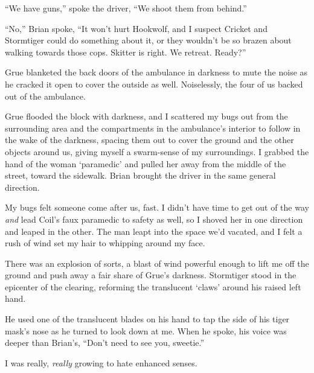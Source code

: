 ``We have guns,'' spoke the driver, ``We shoot them from behind.''



``No,'' Brian spoke, ``It won't hurt Hookwolf, and I suspect Cricket and Stormtiger could do something about it, or they wouldn't be so brazen about walking towards those cops.  Skitter is right.  We retreat.  Ready?''



Grue blanketed the back doors of the ambulance in darkness to mute the noise as he cracked it open to cover the outside as well.  Noiselessly, the four of us backed out of the ambulance.



Grue flooded the block with darkness, and I scattered my bugs out from the surrounding area and the compartments in the ambulance's interior to follow in the wake of the darkness, spacing them out to cover the ground and the other objects around us, giving myself a swarm-sense of my surroundings.  I grabbed the hand of the woman `paramedic' and pulled her away from the middle of the street, toward the sidewalk.  Brian brought the driver in the same general direction.



My bugs felt someone come after us, fast.  I didn't have time to get out of the way \emph{and} lead Coil's faux paramedic to safety as well, so I shoved her in one direction and leaped in the other.  The man leapt into the space we'd vacated, and I felt a rush of wind set my hair to whipping around my face.



There was an explosion of sorts, a blast of wind powerful enough to lift me off the ground and push away a fair share of Grue's darkness.  Stormtiger stood in the epicenter of the clearing, reforming the translucent `claws' around his raised left hand.



He used one of the translucent blades on his hand to tap the side of his tiger mask's nose as he turned to look down at me.  When he spoke, his voice was deeper than Brian's, ``Don't need to see you, sweetie.''



I was really, \emph{really} growing to hate enhanced senses.





